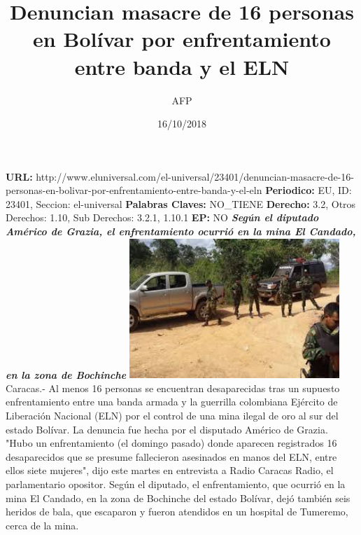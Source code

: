 \documentclass{article}%
\title{\textbf{Denuncian masacre de 16 personas en Bolívar por enfrentamiento entre banda y el ELN}}%
\author{AFP}%
\date{16/10/2018}%
\begin{document}
%
\normalsize%
\maketitle%
\textbf{URL: }%
http://www.eluniversal.com/el{-}universal/23401/denuncian{-}masacre{-}de{-}16{-}personas{-}en{-}bolivar{-}por{-}enfrentamiento{-}entre{-}banda{-}y{-}el{-}eln\newline%
%
\textbf{Periodico: }%
EU, %
ID: %
23401, %
Seccion: %
el{-}universal\newline%
%
\textbf{Palabras Claves: }%
NO\_TIENE\newline%
%
\textbf{Derecho: }%
3.2, %
Otros Derechos: %
1.10, %
Sub Derechos: %
3.2.1, 1.10.1\newline%
%
\textbf{EP: }%
NO\newline%
\newline%
%
\textbf{\textit{Según el diputado Américo de Grazia, el enfrentamiento ocurrió en la mina El Candado, en la zona de Bochinche}}%
\newline%
\newline%
%
\includegraphics[width=300px]{72.jpg}%
\newline%
%
Caracas.{-} Al menos 16 personas se encuentran desaparecidas tras un supuesto enfrentamiento entre una banda armada y la guerrilla colombiana Ejército de Liberación Nacional (ELN) por el control de una mina ilegal de oro al sur del estado Bolívar.%
\newline%
%
La denuncia fue hecha por el disputado Américo de Grazia.  "Hubo un enfrentamiento (el domingo pasado) donde aparecen registrados 16 desaparecidos que se presume fallecieron asesinados en manos del ELN, entre ellos siete mujeres", dijo este martes en entrevista a Radio Caracas Radio, el parlamentario opositor.%
\newline%
%
Según el diputado, el enfrentamiento, que ocurrió en la mina El Candado, en la zona de Bochinche del estado Bolívar, dejó también seis heridos de bala, que escaparon y fueron atendidos en un hospital de Tumeremo, cerca de la mina.%
\end{document}
